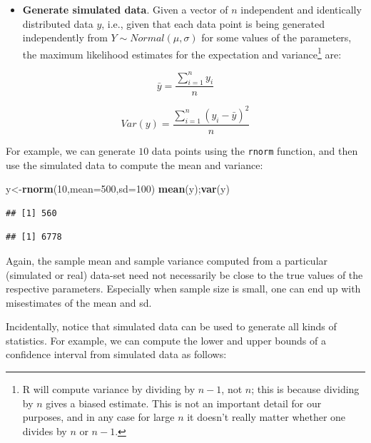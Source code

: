 \documentclass[12pt,]{krantz}
\newenvironment{Shaded}{\begin{snugshade}}{\end{snugshade}}
\newcommand{\DataTypeTok}[1]{\textcolor[rgb]{0.13,0.29,0.53}{#1}}
\newcommand{\DecValTok}[1]{\textcolor[rgb]{0.00,0.00,0.81}{#1}}
\newcommand{\KeywordTok}[1]{\textcolor[rgb]{0.13,0.29,0.53}{\textbf{#1}}}
\newcommand{\NormalTok}[1]{#1}
\providecommand{\tightlist}{%
  \setlength{\itemsep}{0pt}\setlength{\parskip}{0pt}}
\theoremstyle{definition}
\theoremstyle{definition}
\theoremstyle{definition}
\theoremstyle{remark}
\begin{document}
\begin{itemize}
\tightlist
\item
  \textbf{Generate simulated data}. Given a vector of \(n\) independent and identically distributed data \(y\), i.e., given that each data point is being generated independently from \(Y \sim Normal(\mu,\sigma)\) for some values of the parameters, the maximum likelihood estimates for the expectation and variance\footnote{R will compute variance by dividing by \(n-1\), not \(n\); this is because dividing by \(n\) gives a biased estimate. This is not an important detail for our purposes, and in any case for large \(n\) it doesn't really matter whether one divides by \(n\) or \(n-1\).} are:
\end{itemize}

\begin{equation}
\bar{y} =  \frac{\sum_{i=1}^n y_i}{n} 
\end{equation}

\begin{equation}
Var(y) = \frac{\sum_{i=1}^n (y_i-
\bar{y})^2}{n}
\end{equation}

For example, we can generate \(10\) data points using the \texttt{rnorm} function, and then use the simulated data to compute the mean and variance:

\begin{Shaded}
\begin{Highlighting}[]
\NormalTok{y<-}\KeywordTok{rnorm}\NormalTok{(}\DecValTok{10}\NormalTok{,}\DataTypeTok{mean=}\DecValTok{500}\NormalTok{,}\DataTypeTok{sd=}\DecValTok{100}\NormalTok{)}
\KeywordTok{mean}\NormalTok{(y);}\KeywordTok{var}\NormalTok{(y)}
\end{Highlighting}
\end{Shaded}

\begin{verbatim}
## [1] 560
\end{verbatim}

\begin{verbatim}
## [1] 6778
\end{verbatim}

Again, the sample mean and sample variance computed from a particular (simulated or real) data-set need not necessarily be close to the true values of the respective parameters. Especially when sample size is small, one can end up with misestimates of the mean and sd.

Incidentally, notice that simulated data can be used to generate all kinds of statistics. For example, we can compute the lower and upper bounds of a confidence interval from simulated data as follows:
\end{document}
